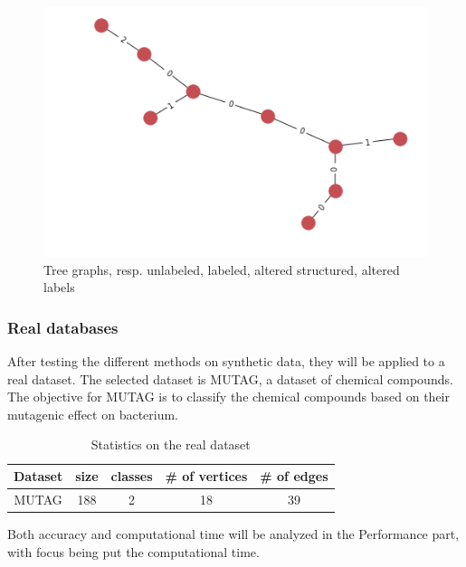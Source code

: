 \documentclass{article}
\theoremstyle{definition}
\begin{document}
\begin{figure}[!htb]
\begin{multicols}{4}
		\includegraphics[width=\linewidth]{data/generated-graphs/tree_altered_labels.png}\par
	\end{multicols}
	\caption{Tree graphs, resp. unlabeled, labeled, altered structured, altered labels}
\end{figure}
\subsubsection{Real databases}
After testing the different methods on synthetic data, they will be applied to a real dataset. The selected dataset is MUTAG, a dataset of chemical compounds. The objective for MUTAG is to classify the chemical compounds based on their mutagenic effect on bacterium.
\begin{table}[!htb]
	\begin{center}
		\begin{tabular}{|c|c|c|c|c|}
			\hline
			Dataset & size & classes & \# of vertices & \# of edges\\
			\hline
			MUTAG & 188 & 2 & 18 & 39\\
			\hline
		\end{tabular}
	\end{center}
	\caption {Statistics on the real dataset}
	\label{tab:stats_real}
\end{table} Both accuracy and computational time will be analyzed in the Performance part, with focus being put the computational time.
\end{document}
